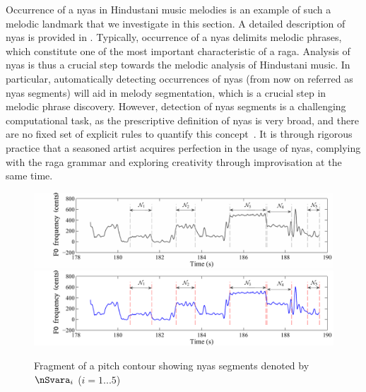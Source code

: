 {Occurrence of a \gls{nyas} in Hindustani music melodies is an example of such a melodic landmark that we investigate in this section. A detailed description of \gls{nyas} is provided in . Typically, occurrence of a \gls{nyas} delimits melodic phrases, which constitute one of the most important characteristic of a \gls{raga}. Analysis of \gls{nyas} is thus a crucial step towards the melodic analysis of Hindustani music. In particular, automatically detecting occurrences of \gls{nyas} (from now on referred as \gls{nyas} segments) will aid in melody segmentation, which is a crucial step in melodic phrase discovery. However, detection of \gls{nyas} segments is a challenging computational task, as the prescriptive definition of \gls{nyas} is very broad, and there are no fixed set of explicit rules to quantify this concept~\citep[p. 73]{Dey2008}. It is through rigorous practice that a seasoned artist acquires perfection in the usage of \gls{nyas}, complying with the \gls{raga} grammar and exploring creativity through improvisation at the same time. 


\begin{figure}
	\begin{center}
		\ifdefined\PRINTVER
			\includegraphics[width=\figSizeHundred]{ch05_preprocessing/figures/NyasFragmentChallenge_BW.pdf}
		\else
			\includegraphics[width=\figSizeHundred]{ch05_preprocessing/figures/NyasFragmentChallenge.pdf}
		\fi
		
	\end{center}
	\caption[Fragment of a pitch contour showing \gls{nyas} segments]{Fragment of a pitch contour showing \gls{nyas} segments denoted by $\nSvara_i$ ($i={1...5}$)}
	\label{fig:nyas_segments_example}
\end{figure}

}
